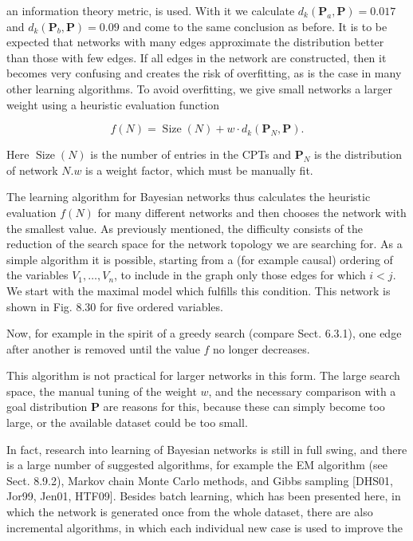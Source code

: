 \documentclass[10pt]{article}
\begin{document}
an information theory metric, is used. With it we calculate $d_{k}\left(\boldsymbol{P}_{a}, \boldsymbol{P}\right)=0.017$ and $d_{k}\left(\boldsymbol{P}_{b}, \boldsymbol{P}\right)=0.09$ and come to the same conclusion as before. It is to be expected that networks with many edges approximate the distribution better than those with few edges. If all edges in the network are constructed, then it becomes very confusing and creates the risk of overfitting, as is the case in many other learning algorithms. To avoid overfitting, we give small networks a larger weight using a heuristic evaluation function

$$
f(N)=\operatorname{Size}(N)+w \cdot d_{k}\left(\boldsymbol{P}_{N}, \boldsymbol{P}\right) .
$$

Here $\operatorname{Size}(N)$ is the number of entries in the CPTs and $\boldsymbol{P}_{N}$ is the distribution of network $N . w$ is a weight factor, which must be manually fit.

The learning algorithm for Bayesian networks thus calculates the heuristic evaluation $f(N)$ for many different networks and then chooses the network with the smallest value. As previously mentioned, the difficulty consists of the reduction of the search space for the network topology we are searching for. As a simple algorithm it is possible, starting from a (for example causal) ordering of the variables $V_{1}, \ldots, V_{n}$, to include in the graph only those edges for which $i<j$. We start with the maximal model which fulfills this condition. This network is shown in Fig. 8.30 for five ordered variables.

Now, for example in the spirit of a greedy search (compare Sect. 6.3.1), one edge after another is removed until the value $f$ no longer decreases.

This algorithm is not practical for larger networks in this form. The large search space, the manual tuning of the weight $w$, and the necessary comparison with a goal distribution $\boldsymbol{P}$ are reasons for this, because these can simply become too large, or the available dataset could be too small.

In fact, research into learning of Bayesian networks is still in full swing, and there is a large number of suggested algorithms, for example the EM algorithm (see Sect. 8.9.2), Markov chain Monte Carlo methods, and Gibbs sampling [DHS01, Jor99, Jen01, HTF09]. Besides batch learning, which has been presented here, in which the network is generated once from the whole dataset, there are also incremental algorithms, in which each individual new case is used to improve the
\end{document}

